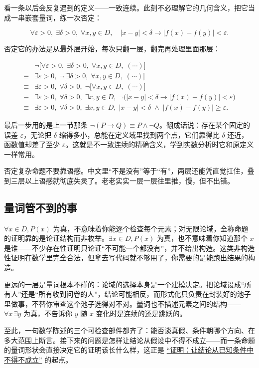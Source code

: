 看一条以后会反复遇到的定义——一致连续。此刻不必理解它的几何含义，把它当成一串嵌套量词，练一次否定：

\[
\forall\varepsilon>0,\;\exists\delta>0,\;\forall x,y\in D,\quad
|x-y|<\delta\to|f(x)-f(y)|<\varepsilon.
\]

否定它的办法是从最外层开始，每次只翻一层，翻完再处理里面那层：

\[
\begin{aligned}
&\neg\bigl[\forall\varepsilon>0,\;\exists\delta>0,\;\forall x,y\in D,\;(\cdots)\bigr]\\
\equiv{}&\exists\varepsilon>0,\;\neg\bigl[\exists\delta>0,\;\forall x,y\in D,\;(\cdots)\bigr]\\
\equiv{}&\exists\varepsilon>0,\;\forall\delta>0,\;\neg\bigl[\forall x,y\in D,\;(\cdots)\bigr]\\
\equiv{}&\exists\varepsilon>0,\;\forall\delta>0,\;\exists x,y\in D,\;
\neg\bigl(|x-y|<\delta\to|f(x)-f(y)|<\varepsilon\bigr)\\
\equiv{}&\exists\varepsilon>0,\;\forall\delta>0,\;\exists x,y\in D,\;
|x-y|<\delta\;\land\;|f(x)-f(y)|\ge\varepsilon.
\end{aligned}
\]

最后一步用的是上一节那条 \(\neg(P\to Q)\equiv P\land\neg Q\)。翻成话说：存在某个固定的误差 \(\varepsilon\)，无论把 \(\delta\) 缩得多小，总能在定义域里找到两个点，它们靠得比 \(\delta\) 还近，函数值却差了至少 \(\varepsilon\)。这就是不一致连续的精确含义，学到实数分析时它和原定义一样常用。

否定复杂命题不要靠语感。中文里``不是没有''等于``有''，两层还能凭直觉扛住，叠到三层以上语感就彻底失灵了。老老实实一层一层往里推，慢，但不出错。

\subsection{量词管不到的事}

\(\forall x\in D,P(x)\) 为真，不意味着你能逐个检查每个元素；对无限论域，全称命题的证明靠的是论证结构而非枚举。\(\exists x\in D,P(x)\) 为真，也不意味着你知道那个 \(x\) 是谁——不少存在性证明只论证``不可能一个都没有''，并不给出构造。这类非构造性证明在数学里完全合法，但拿去写代码就不够用了，你需要的是能跑出结果的构造。

更远的一层是量词根本不碰的：论域的选择本身是一个建模决定。把论域设成``所有人''还是``所有收到问卷的人''，结论可能相反，而形式化只负责在封装好的池子里做事，不替你审查这个池子选得对不对。量词也不描述元素之间的结构——\(\forall x\,\exists y\) 为真，不告诉你 \(y\) 随 \(x\) 变化时是连续的还是跳跃的。

至此，一句数学陈述的三个可检查部件都齐了：能否谈真假、条件朝哪个方向、在多大范围上断言。接下来的问题是怎样让结论从假设中不得不成立——而一条命题的量词形状会直接决定它的证明该长什么样，这正是 \hyperref[ch:006]{``证明：让结论从已知条件中不得不成立''} 的起点。
